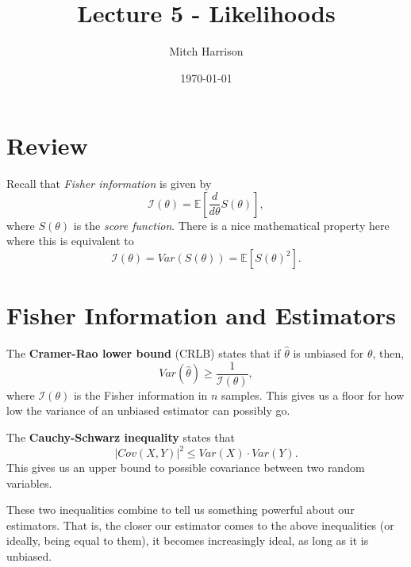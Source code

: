 \documentclass[titlepage, 12pt, leqno]{article}
\title{\Huge{Lecture 5 - Likelihoods}}
\author{\large{Mitch Harrison}}
\date{\today}
\begin{document}
\setlength{\parskip}{1\baselineskip}
\setlength{\parindent}{15pt}
\maketitle
\tableofcontents
\newpage


\section{Review}

Recall that \textit{Fisher information} is given by
\[
    \mathcal{I}(\theta) = \mathbb{E}\left[\frac{d}{d \theta}S(\theta)\right],
\]
where $S(\theta)$ is the \textit{score function}. There is a nice mathematical
property here where this is equivalent to
\[
    \mathcal{I}(\theta) = Var(S(\theta)) = \mathbb{E}[S(\theta)^{2}].
\]
\pagebreak
\section{Fisher Information and Estimators}
\begin{definition}
    The \textbf{Cramer-Rao lower bound} (CRLB) states that if $\hat \theta$ is
    unbiased for $\theta$, then,
    \[
    Var(\hat \theta) \ge \frac{1}{\mathcal{I}(\theta)},
    \]
    where $\mathcal{I}(\theta)$ is the Fisher information in $n$ samples. This
    gives us a floor for how low the variance of an unbiased estimator can
    possibly go.
\end{definition}

\begin{definition}
    The \textbf{Cauchy-Schwarz inequality} states that
    \[
    |Cov(X,Y)|^{2} \le Var(X) \cdot Var(Y).
    \]
    This gives us an upper bound to possible covariance between two random
    variables.
\end{definition}

These two inequalities combine to tell us something powerful about our 
estimators. That is, the closer our estimator comes to the above inequalities
(or ideally, being equal to them), it becomes increasingly ideal, as long as it
is unbiased.
\end{document}
